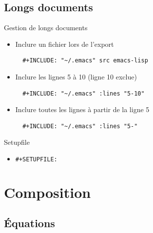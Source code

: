 \documentclass[presentation,t,hideothersubsections]{beamer}
\begin{document}
\subsection{Longs documents}
\label{sec-2-9}

\begin{frame}[fragile,label=sec-2-9-1]{Gestion de longs documents}
 \begin{itemize}
\item Inclure un fichier lors de l'export

\lstset{language=org,numbers=none}
\begin{lstlisting}
  #+INCLUDE: "~/.emacs" src emacs-lisp
\end{lstlisting}

\item Inclure les lignes 5 à 10 (ligne 10 exclue)

\lstset{language=org,numbers=none}
\begin{lstlisting}
  #+INCLUDE: "~/.emacs" :lines "5-10"
\end{lstlisting}

\item Inclure toutes les lignes à partir de la ligne 5

\lstset{language=org,numbers=none}
\begin{lstlisting}
  #+INCLUDE: "~/.emacs" :lines "5-"
\end{lstlisting}
\end{itemize}
\end{frame}
\begin{frame}[fragile,label=sec-2-9-2]{Setupfile}
 \begin{itemize}
\item \texttt{\#+SETUPFILE:}
\end{itemize}
\end{frame}
\section{Composition}
\label{sec-3}

\subsection{Équations}
\label{sec-3-1}
\end{document}
